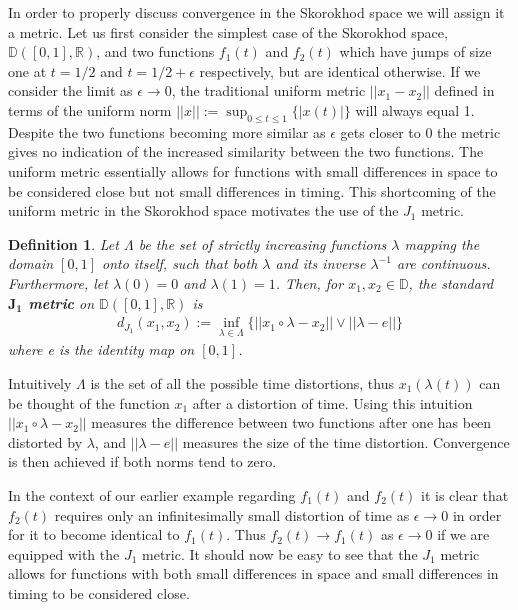 \documentclass[honours,12pt]{UNSWthesis}
\newcommand{\R}{\mathbb{R}}
\newcommand{\1}{\mathbf 1}
\newcommand{\D}{\mathbb{D}}
\newtheorem{definition}[theorem]{Definition}
\numberwithin{equation}{section}
\theoremstyle{definition}
\theoremstyle{remark}
\begin{document}
\noindent In order to properly discuss convergence in the Skorokhod space we will assign it a metric. Let us first consider the simplest case of the Skorokhod space, $\D([0,1],\R)$, and two functions $f_1(t)$ and $f_2(t)$ which have jumps of size one at $t=1/2$ and $t=1/2+\epsilon$ respectively, but are identical otherwise. If we consider the limit as $\epsilon\to0$, the traditional uniform metric $||x_1-x_2||$ defined in terms of the uniform norm $||x||:=\sup_{0\leq t\leq1}\{|x(t)|\}$ will always equal 1. Despite the two functions becoming more similar as $\epsilon$ gets closer to 0 the metric gives no indication of the increased similarity between the two functions. The uniform metric essentially allows for functions with small differences in space to be considered close but not small differences in timing. This shortcoming of the uniform metric in the Skorokhod space motivates the use of the $J_1$ metric.\\
\begin{definition}
	Let $\Lambda$ be the set of strictly increasing functions $\lambda$ mapping the domain $[0,1]$ onto itself, such that both $\lambda$ and its inverse $\lambda^{-1}$ are continuous. Furthermore, let $\lambda(0)=0$ and $\lambda(1)=1$. Then, for $x_1,x_2\in\D$, the standard \textbf{$\boldsymbol{J_1}$ metric} on $\D([0,1],\R)$ is 
	\begin{align*}
		d_{J_1}(x_1,x_2):=\inf_{\lambda \in \Lambda}\{||x_1 \circ \lambda -x_2||\vee||\lambda - e|| \}
	\end{align*}
	where e is the identity map on $[0,1]$.\\
\end{definition}
\noindent Intuitively $\Lambda$ is the set of all the possible time distortions, thus $x_1(\lambda(t))$ can be thought of the function $x_1$ after a distortion of time. Using this intuition $||x_1 \circ \lambda -x_2||$ measures the difference between two functions after one has been distorted by $\lambda$, and $||\lambda - e||$ measures the size of the time distortion. Convergence is then achieved if both norms tend to zero.

 In the context of our earlier example regarding $f_1(t)$ and $f_2(t)$ it is clear that $f_2(t)$ requires only an infinitesimally small distortion of time as $\epsilon\to0$ in order for it to become identical to $f_1(t)$. Thus $f_2(t)\to f_1(t)$ as $\epsilon\to0$ if we are equipped with the $J_1$ metric. It should now be easy to see that the $J_1$ metric allows for functions with both small differences in space and small differences in timing to be considered close.
\end{document}

